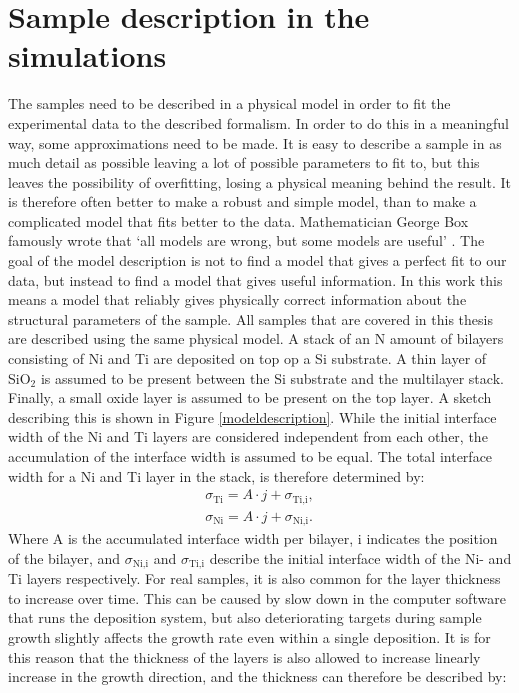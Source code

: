 \section{Sample description in the simulations}
The samples need to be described in a physical model in order to fit the experimental data to the described formalism. In order to do this in a meaningful way, some approximations need to be made. It is easy to describe a sample in as much detail as possible leaving a lot of possible parameters to fit to, but this leaves the possibility of overfitting, losing a physical meaning behind the result. It is therefore often better to make a robust and simple model, than to make a complicated model that fits better to the data. Mathematician George Box famously wrote that  ‘all models are wrong, but some models are useful’ \cite{george_box}. The goal of the model description is not to find a model that gives a perfect fit to our data, but instead to find a model that gives useful information.  In this work this means a model that reliably gives physically correct information about the structural parameters of the sample. All samples that are covered in this thesis are described using the same physical model. A stack of an N amount of bilayers consisting of Ni and Ti are deposited on top op a Si substrate. A thin layer of SiO$_\textrm{2}$ is assumed to be present between the Si substrate and the multilayer stack. Finally, a small oxide layer is assumed to be present on the top layer. A sketch describing this is shown in Figure \ref{modeldescription}. While the initial interface width of the Ni and Ti layers are considered independent from each other, the accumulation of the interface width is assumed to be equal. The total interface width for a Ni and Ti layer in the stack, is therefore determined by:
\begin{eqnarray}
	\sigma_{\textrm{Ti}} = A \cdot j + \sigma_{\textrm{Ti,i}}, \\
	\sigma_{\textrm{Ni}} = A \cdot j + \sigma_{\textrm{Ni,i}}.
\end{eqnarray}
Where A is the accumulated interface width per bilayer, i indicates the position of the bilayer, and $\sigma_{\textrm{Ni,i}}$ and $\sigma_{\textrm{Ti,i}}$ describe the initial interface width of the Ni- and Ti layers respectively. For real samples, it is also common for the layer thickness to increase over time. This can be caused by slow down in the computer software that runs the deposition system, but also deteriorating targets during sample growth slightly affects the growth rate even within a single deposition. It is for this reason that the thickness of the layers is also allowed to increase linearly increase in the growth direction, and the thickness can therefore be described by:
